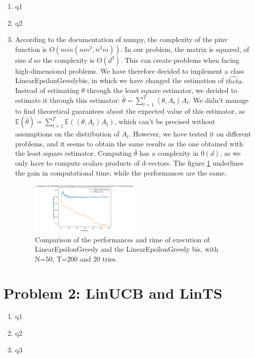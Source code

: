 \begin{enumerate}
    \item q1
    \item q2
    \item According to the documentation of numpy, the complexity of the pinv function is $O(min(n m^2, n^2m))$. In our problem, the matrix is squared, of size $d$ so the complexity is $O(d^3)$.
This can create problems when facing high-dimensional problems. We have therefore decided to implement a class LinearEpsilonGreedybis, in which we have changed the estimation of $\hat{theta}$. 
Instead of estimating $\theta$ through the least square estimator, we decided to estimate it through this estimator: $\hat{\theta} = \sum_{t=1}^{T} \left\langle \theta , A_t\right\rangle A_t$. 
We didn't manage to find theoretical guarantees about the expected value of this estimator, as $\mathbb{E}(\hat{\theta}) = \sum_{t=1}^{T} \mathbb{E} ( \left\langle \theta , A_t\right\rangle A_t) $, which can't be precised without assumptions on the distribution of $A_t$.
However, we have tested it on different problems, and it seems to obtain the same results as the one obtained with the least square estimator.
Computing $\hat{\theta}$ has a complexity in $0(d)$, as we only have to compute scalars products of d-vectors. The figure \ref{fig:lin_epsilon_greedy} underlines the gain in computational time, while the performances are the same.

\begin{figure}[h]
    \centering
    \includegraphics[width=0.5\textwidth]{images/comparison.png}
    \caption{Comparison of the performances and rime of execution of LinearEpsilonGreedy and the LinearEpsilonGreedy bis, with N=50, T=200 and 20 tries.} 
    \label{fig:lin_epsilon_greedy}
\end{figure}





\end{enumerate}


\section{Problem 2: LinUCB and LinTS}


\begin{enumerate}
    \item q1
    \item q2
    \item q3
\end{enumerate}

